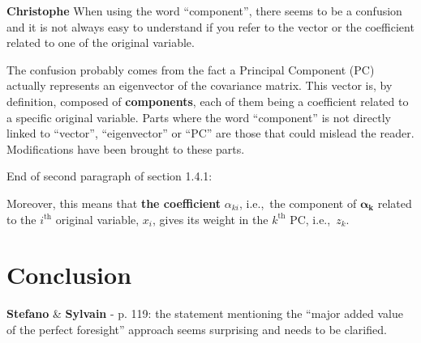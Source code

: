\documentclass[12pt,a4paper]{article}
\def\ie{i.e.,\ }
\begin{document}
\noindent 

\begin{mdframed}[style=manuscript] %

\end{mdframed}

\begin{mdframed}[style=comment] %
{\color{violet} \textbf{Christophe}} When using the word ``component'', there seems to be a confusion and it is not always easy to understand if you refer to the vector or the coefficient related to one of the original variable.
\end{mdframed}

\noindent The confusion probably comes from the fact a Principal Component (PC) actually represents an eigenvector of the covariance matrix. This vector is, by definition, composed of \textbf{components}, each of them being a coefficient related to a specific original variable. Parts where the word ``component'' is not directly linked to ``vector'', ``eigenvector'' or ``PC'' are those that could mislead the reader. Modifications have been brought to these parts.

{\color{blue} End of second paragraph of section 1.4.1}:

\begin{mdframed}[style=manuscript] %
Moreover, this means that \textbf{the coefficient} $\alpha_{ki}$, \ie the component of $\bm{\alpha}_{\mathbf{k}}$ related to the $i^{\text{th}}$ original variable, $x_i$,  gives its weight in the $k^{\text{th}}$ PC, \ie $z_k$. 
\end{mdframed}

\section{Conclusion}
\label{Conclusion}

\begin{mdframed}[style=comment] %
{\color{orange} \textbf{Stefano}} \& {\color{purple} \textbf{Sylvain}} - p. 119: the statement mentioning the ``major added value of the perfect foresight'' approach seems surprising and needs to be clarified. 
\end{mdframed}

\noindent 

\begin{mdframed}[style=manuscript] %

\end{mdframed}
\end{document}

